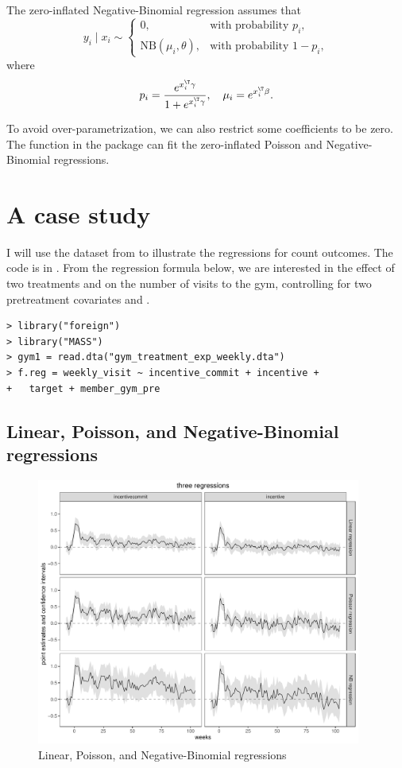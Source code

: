  
The zero-inflated Negative-Binomial regression assumes that
\[
y_{i}\mid x_{i}\sim\begin{cases}
0, & \text{with probability }p_{i},\\
\text{NB}(\mu_{i},\theta), & \text{with probability }1-p_{i},
\end{cases}
\]
where 
$$
p_{i}  =\frac{e^{x_{i}^{\T}\gamma}}{1+e^{x_{i}^{\T}\gamma}},\quad 
\mu_{i}  = e^{x_{i}^{\T}\beta} .
$$

To avoid over-parametrization, we can also restrict some coefficients
to be zero. 
The   function in the  package  can fit the zero-inflated Poisson and Negative-Binomial regressions. 


\section{A case study}\label{sec::count-case-study}

I will use the dataset from \citet{royer2015incentives} to illustrate the regressions for count outcomes. The  code is in . 
From the regression formula below, we are interested in the effect of two treatments  and  on the number of visits to the gym, controlling for two pretreatment covariates  and . 

\begin{lstlisting}
> library("foreign")
> library("MASS")
> gym1 = read.dta("gym_treatment_exp_weekly.dta")
> f.reg = weekly_visit ~ incentive_commit + incentive + 
+   target + member_gym_pre
\end{lstlisting}



\subsection{Linear, Poisson, and Negative-Binomial regressions}

\begin{figure}[ht]
\centering
\includegraphics[width = 0.95\textwidth]{figures/threeregressions.pdf}
\caption{Linear, Poisson, and Negative-Binomial regressions}\label{fig::three regressions}
\end{figure}



